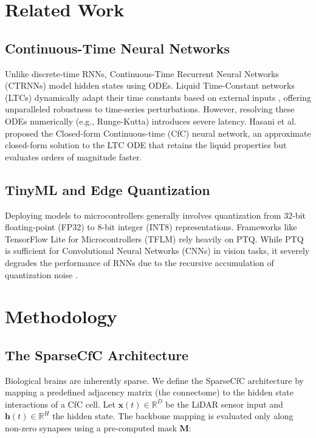 \documentclass[lettersize,journal]{IEEEtran}
\begin{document}
\section{Related Work}

\subsection{Continuous-Time Neural Networks}
Unlike discrete-time RNNs, Continuous-Time Recurrent Neural Networks (CTRNNs) model hidden states using ODEs. Liquid Time-Constant networks (LTCs) dynamically adapt their time constants based on external inputs \cite{hasani2021liquid}, offering unparalleled robustness to time-series perturbations. However, resolving these ODEs numerically (e.g., Runge-Kutta) introduces severe latency. Hasani et al. \cite{hasani2022closed} proposed the Closed-form Continuous-time (CfC) neural network, an approximate closed-form solution to the LTC ODE that retains the liquid properties but evaluates orders of magnitude faster.

\subsection{TinyML and Edge Quantization}
Deploying models to microcontrollers generally involves quantization from 32-bit floating-point (FP32) to 8-bit integer (INT8) representations. Frameworks like TensorFlow Lite for Microcontrollers (TFLM) \cite{david2021tensorflow} rely heavily on PTQ. While PTQ is sufficient for Convolutional Neural Networks (CNNs) in vision tasks, it severely degrades the performance of RNNs due to the recursive accumulation of quantization noise \cite{hubara2017quantized}. 

\section{Methodology}

\subsection{The SparseCfC Architecture}
Biological brains are inherently sparse. We define the SparseCfC architecture by mapping a predefined adjacency matrix (the connectome) to the hidden state interactions of a CfC cell. Let $\mathbf{x}(t) \in \mathbb{R}^D$ be the LiDAR sensor input and $\mathbf{h}(t) \in \mathbb{R}^H$ the hidden state. The backbone mapping is evaluated only along non-zero synapses using a pre-computed mask $\mathbf{M}$:
\end{document}
